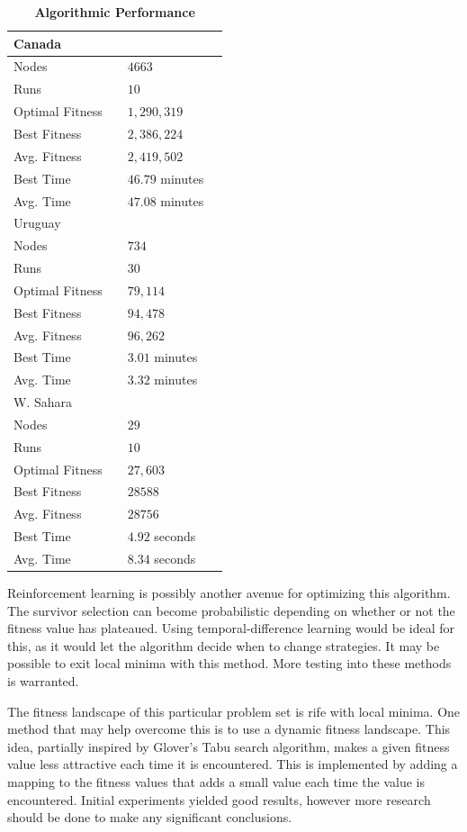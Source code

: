 \documentclass[12pt,twocolumn,oneside]{osajnl}
\begin{document}
\begin{table}[htbp]
\caption{\bf Algorithmic Performance}
\begin{tabular}{llll}
\hline
Canada \\
\hline
Nodes && $4663$ \\
Runs && $10$ \\
Optimal Fitness && $1,290,319$ \\
Best Fitness && $2,386,224$ \\
Avg. Fitness && $2,419,502$ \\
Best Time && $46.79$ minutes \\
Avg. Time && $47.08$ minutes \\
\hline
\hline
Uruguay \\
\hline
Nodes && $734$ \\
Runs && $30$ \\
Optimal Fitness && $79,114$ \\
Best Fitness && $94,478$ \\
Avg. Fitness && $96,262$ \\
Best Time && $3.01$ minutes \\
Avg. Time && $3.32$ minutes \\
\hline
\hline
W. Sahara \\
\hline
Nodes && $29$ \\
Runs && $10$ \\
Optimal Fitness && $27,603$ \\
Best Fitness && $28588$ \\
Avg. Fitness && $28756$ \\
Best Time && $4.92$ seconds \\
Avg. Time && $8.34$ seconds \\
\hline
\hline
\end{tabular}
  \label{tab:sum}
\end{table}

Reinforcement learning is possibly another avenue for optimizing this algorithm. The survivor selection can become probabilistic depending on whether or not the fitness value has plateaued. Using temporal-difference learning would be ideal for this, as it would let the algorithm decide when to change strategies. It may be possible to exit local minima with this method. More testing into these methods is warranted.

The fitness landscape of this particular problem set is rife with local minima. One method that may help overcome this is to use a dynamic fitness landscape. This idea, partially inspired by Glover's Tabu search algorithm\cite{wiki:xxx}, makes a given fitness value less attractive each time it is encountered. This is implemented by adding a mapping to the fitness values that adds a small value each time the value is encountered. Initial experiments yielded good results, however more research should be done to make any significant conclusions.
\end{document}
